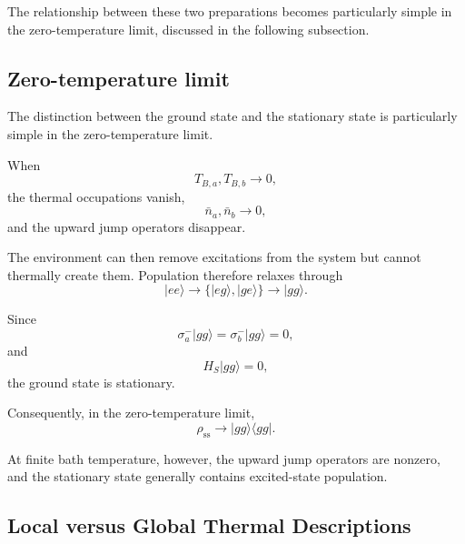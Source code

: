 \documentclass[11pt]{article}
\begin{document}
The relationship between these two preparations becomes particularly
simple in the zero-temperature limit, discussed in the following
subsection.


\subsection{Zero-temperature limit}

The distinction between the ground state and the stationary state is
particularly simple in the zero-temperature limit.

When
%
\begin{equation}
T_{B,a},T_{B,b}\rightarrow0,
\end{equation}
%
the thermal occupations vanish,
%
\begin{equation}
\bar{n}_a,\bar{n}_b\rightarrow0,
\end{equation}
%
and the upward jump operators disappear.

The environment can then remove excitations from the system but cannot
thermally create them. Population therefore relaxes through
%
\begin{equation}
|ee\rangle
\rightarrow
\{|eg\rangle,|ge\rangle\}
\rightarrow
|gg\rangle.
\end{equation}

Since
%
\begin{equation}
\sigma_a^-|gg\rangle
=
\sigma_b^-|gg\rangle
=
0,
\end{equation}
%
and
%
\begin{equation}
H_S|gg\rangle
=
0,
\end{equation}
%
the ground state is stationary.

Consequently, in the zero-temperature limit,
%
\begin{equation}
\boxed{
\rho_{\mathrm{ss}}
\rightarrow
|gg\rangle\langle gg|.
}
\label{eq:ss_zero_temperature}
\end{equation}

At finite bath temperature, however, the upward jump operators are
nonzero, and the stationary state generally contains excited-state
population.


\subsection{Local versus Global Thermal Descriptions}
\label{subsec:local_global_master}
\end{document}
